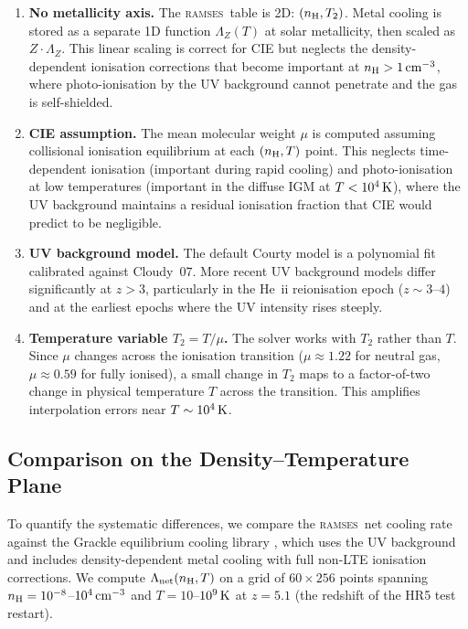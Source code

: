 \documentclass[fleqn,usenatbib]{mnras}
\newcommand{\ramses}{\textsc{ramses}}
\begin{document}
\begin{enumerate}
  \item \textbf{No metallicity axis.}
    The \ramses\ table is 2D: $(n_{\rm H}, T_2)$.  Metal cooling is
    stored as a separate 1D function $\Lambda_Z(T)$ at solar
    metallicity, then scaled as $Z \cdot \Lambda_Z$.  This linear scaling
    is correct for CIE but neglects the density-dependent ionisation
    corrections that become important at $n_{\rm H} > 1\,{\rm cm}^{-3}$,
    where photo-ionisation by the UV background cannot penetrate and the
    gas is self-shielded.

  \item \textbf{CIE assumption.}
    The mean molecular weight $\mu$ is computed assuming collisional
    ionisation equilibrium at each $(n_{\rm H}, T)$ point.  This neglects
    time-dependent ionisation (important during rapid cooling) and
    photo-ionisation at low temperatures (important in the diffuse IGM
    at $T < 10^4\,{\rm K}$), where the UV background maintains a
    residual ionisation fraction that CIE would predict to be negligible.

  \item \textbf{UV background model.}
    The default Courty model is a polynomial fit calibrated against
    Cloudy~07.  More recent UV background models
    \citep[e.g.][]{HM2012,FG2020} differ significantly at $z > 3$,
    particularly in the He~{\sc ii} reionisation epoch ($z \sim 3$--$4$)
    and at the earliest epochs where the UV intensity rises steeply.

  \item \textbf{Temperature variable $T_2 = T/\mu$.}
    The solver works with $T_2$ rather than $T$.  Since $\mu$ changes
    across the ionisation transition ($\mu \approx 1.22$ for neutral gas,
    $\mu \approx 0.59$ for fully ionised), a small change in $T_2$ maps
    to a factor-of-two change in physical temperature $T$ across the
    transition.  This amplifies interpolation errors near
    $T \sim 10^4\,{\rm K}$.
\end{enumerate}


\subsection{Comparison on the Density--Temperature Plane}
\label{sec:cool_compare}

To quantify the systematic differences, we compare the \ramses\ net
cooling rate against the Grackle equilibrium cooling library
\citep{Smith2017}, which uses the \citet{HM2012} UV background
and includes density-dependent metal cooling with full
non-LTE ionisation corrections.  We compute
$\Lambda_{\rm net}(n_{\rm H}, T)$ on a grid of $60 \times 256$ points
spanning $n_{\rm H} = 10^{-8}$--$10^{4}\,{\rm cm}^{-3}$ and
$T = 10$--$10^{9}\,{\rm K}$ at $z = 5.1$ (the redshift of the HR5 test
restart).
\end{document}
